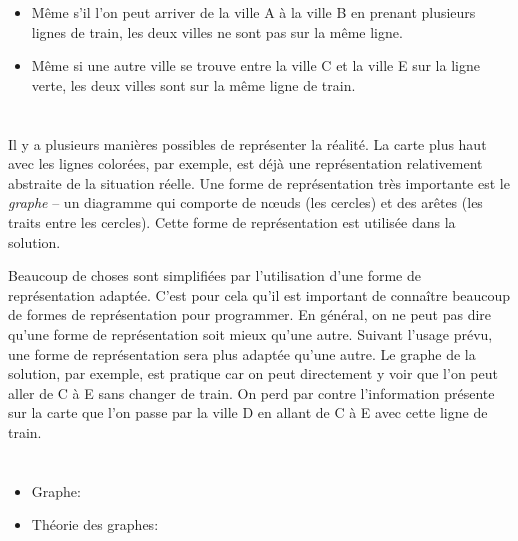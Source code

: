 {{\begin{itemize}
  \item Même s’il l’on peut arriver de la ville A à la ville B en prenant plusieurs lignes de train, les deux villes ne sont pas sur la même ligne.
  \item Même si une autre ville se trouve entre la ville C et la ville E sur la ligne verte, les deux villes sont sur la même ligne de train.
\end{itemize}



\section*{\BrochureItsInformatics}
Il y a plusieurs manières possibles de représenter la réalité. La carte plus haut avec les lignes colorées, par exemple, est déjà une représentation relativement abstraite de la situation réelle. Une forme de représentation très importante est le \emph{graphe} – un diagramme qui comporte de nœuds (les cercles) et des arêtes (les traits entre les cercles). Cette forme de représentation est utilisée dans la solution.

Beaucoup de choses sont simplifiées par l’utilisation d’une forme de représentation adaptée. C’est pour cela qu’il est important de connaître beaucoup de formes de représentation pour programmer. En général, on ne peut pas dire qu’une forme de représentation soit mieux qu’une autre. Suivant l’usage prévu, une forme de représentation sera plus adaptée qu’une autre. Le graphe de la solution, par exemple, est pratique car on peut directement y voir que l’on peut aller de C à E sans changer de train. On perd par contre l’information présente sur la carte que l’on passe par la ville D en allant de C à E avec cette ligne de train.



\section*{\BrochureWebsitesAndKeywords}
{\raggedright
\begin{itemize}
  \item Graphe: \href{https://fr.wikipedia.org/wiki/Graphe_(math\%C3\%A9matiques_discr\%C3\%A8tes)}{}
  \item Théorie des graphes: \href{https://fr.wikipedia.org/wiki/Th\%C3\%A9orie_des_graphes}{}
\end{itemize}


}}}
